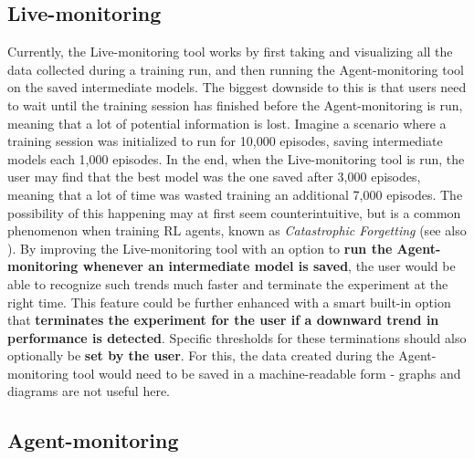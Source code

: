 \subsection{Live-monitoring}\label{subsec:FutureLiveMonitoring}

Currently, the Live-monitoring tool works by first taking and visualizing all the data collected during a training run, and then running the Agent-monitoring tool on the saved intermediate models. The biggest downside to this is that users need to wait until the training session has finished before the Agent-monitoring is run, meaning that a lot of potential information is lost. Imagine a scenario where a training session was initialized to run for 10,000 episodes, saving intermediate models each 1,000 episodes. In the end, when the Live-monitoring tool is run, the user may find that the best model was the one saved after 3,000 episodes, meaning that a lot of time was wasted training an additional 7,000 episodes. The possibility of this happening may at first seem counterintuitive, but is a common phenomenon when training RL agents, known as \emph{Catastrophic Forgetting} (see also \cite{CatastrophicForgetting}). By improving the Live-monitoring tool with an option to \textbf{run the Agent-monitoring whenever an intermediate model is saved}, the user would be able to recognize such trends much faster and terminate the experiment at the right time. This feature could be further enhanced with a smart built-in option that \textbf{terminates the experiment for the user if a downward trend in performance is detected}. Specific thresholds for these terminations should also optionally be \textbf{set by the user}. For this, the data created during the Agent-monitoring tool would need to be saved in a machine-readable form - graphs and diagrams are not useful here.

\subsection{Agent-monitoring}\label{subsec:FutureAgentMonitoring}

